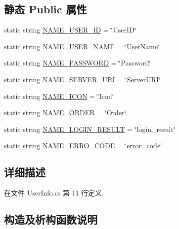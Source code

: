 \subsection*{静态 Public 属性}
\begin{DoxyCompactItemize}
\item 
static string \hyperlink{classcustom__cloud_1_1_user_info_ad3afceee4ce1ba0a5aa1691446438281}{N\+A\+M\+E\+\_\+\+U\+S\+E\+R\+\_\+\+ID} = \char`\"{}User\+ID\char`\"{}
\item 
static string \hyperlink{classcustom__cloud_1_1_user_info_aa6668824e98dd5404577fe333f8047d8}{N\+A\+M\+E\+\_\+\+U\+S\+E\+R\+\_\+\+N\+A\+ME} = \char`\"{}User\+Name\char`\"{}
\item 
static string \hyperlink{classcustom__cloud_1_1_user_info_a413137f992a601c7e7b77320b0a1bf2a}{N\+A\+M\+E\+\_\+\+P\+A\+S\+S\+W\+O\+RD} = \char`\"{}Password\char`\"{}
\item 
static string \hyperlink{classcustom__cloud_1_1_user_info_a9359187c3e87f8450550049455356673}{N\+A\+M\+E\+\_\+\+S\+E\+R\+V\+E\+R\+\_\+\+U\+RI} = \char`\"{}Server\+U\+RI\char`\"{}
\item 
static string \hyperlink{classcustom__cloud_1_1_user_info_af8cb84e4f45bca8a2b10e7a9dccd05ad}{N\+A\+M\+E\+\_\+\+I\+C\+ON} = \char`\"{}Icon\char`\"{}
\item 
static string \hyperlink{classcustom__cloud_1_1_user_info_acc6bc9be781820808fd3c817ca4fbc07}{N\+A\+M\+E\+\_\+\+O\+R\+D\+ER} = \char`\"{}Order\char`\"{}
\item 
static string \hyperlink{classcustom__cloud_1_1_user_info_af2597af37b6b3adba3e52bb829ee87b1}{N\+A\+M\+E\+\_\+\+L\+O\+G\+I\+N\+\_\+\+R\+E\+S\+U\+LT} = \char`\"{}login\+\_\+result\char`\"{}
\item 
static string \hyperlink{classcustom__cloud_1_1_user_info_a9ec27b73001523a1ae581caf9eee9b98}{N\+A\+M\+E\+\_\+\+E\+R\+R\+O\+\_\+\+C\+O\+DE} = \char`\"{}error\+\_\+code\char`\"{}
\end{DoxyCompactItemize}


\subsection{详细描述}


在文件 User\+Info.\+cs 第 11 行定义.



\subsection{构造及析构函数说明}
\mbox{\label{classcustom__cloud_1_1_user_info_a13e5af80bddb7fe0eff2b7414988a277}} 
